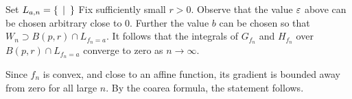Set $L_{a,n}=\set{}{}$
Fix sufficiently small $r>0$.
Observe that the value $\varepsilon$ above can be chosen arbitrary close to $0$.
Further the value $b$ can be chosen so that $W_n\supset B(p,r)\cap L_{f_n=a}$.
It follows that the integrals of $G_{f_n}$ and $H_{f_n}$ over $B(p,r)\cap L_{f_n=a}$ converge to zero as $n\to\infty$.

Since $f_n$ is convex, and close to an affine function,
its gradient is bounded away from zero for all large $n$.
By the coarea formula, the statement follows.
\qeds
